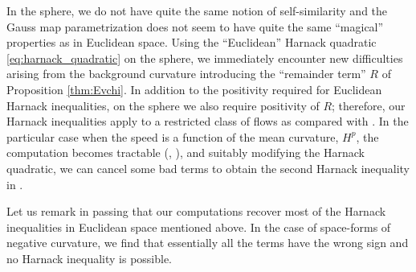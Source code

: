 \documentclass{amsart}
\begin{document}
In the sphere, we do not have quite the same notion of self-similarity and the Gauss map parametrization does not seem to have quite the same ``magical'' properties as in Euclidean space. Using the ``Euclidean'' Harnack quadratic \eqref{eq:harnack_quadratic} on the sphere, we immediately encounter new difficulties arising from the background curvature introducing the ``remainder term'' $R$ of Proposition \ref{thm:Evchi}. In addition to the positivity required for Euclidean Harnack inequalities, on the sphere we also require positivity of $R$; therefore, our Harnack inequalities apply to a restricted class of flows as compared with \cite{Andrews:09/1994}. In the particular case when the speed is a function of the mean curvature, \(H^p\), the computation becomes tractable (, ), and suitably modifying the Harnack quadratic, we can cancel some bad terms to obtain the second Harnack inequality in .

Let us remark in passing that our computations recover most of the Harnack inequalities in Euclidean space mentioned above. In the case of space-forms of negative curvature, we find that essentially all the terms have the wrong sign and no Harnack inequality is possible.

\end{document}
